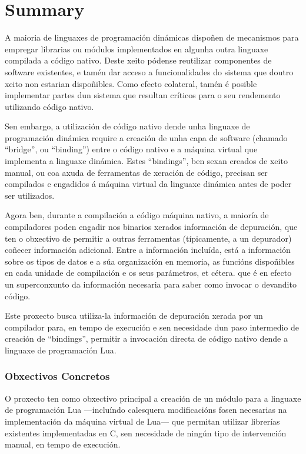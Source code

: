 \chapter*{Summary}

A maioria de linguaxes de programación dinámicas dispoñen de mecanismos
para empregar librarias ou módulos implementados en algunha outra linguaxe
compilada a código nativo. Deste xeito pódense reutilizar componentes
de software existentes, e tamén dar acceso a funcionalidades do sistema que
doutro xeito non estarian dispoñibles. Como efecto colateral, tamén é posible
implementar partes dun sistema que resultan críticos para o seu rendemento
utilizando código nativo.

Sen embargo, a utilización de código nativo dende unha linguaxe de
programación dinámica require a creación de unha capa de software (chamado
“bridge”, ou “binding”) entre o código nativo e a máquina virtual que
implementa a linguaxe dinámica. Estes “bindings”, ben sexan creados de
xeito manual, ou coa axuda de ferramentas de xeración de código, precisan
ser compilados e engadidos á máquina virtual da linguaxe dinámica antes
de poder ser utilizados.

Agora ben, durante a compilación a código máquina nativo, a maioría de
compiladores poden engadir nos binarios xerados información de depuración,
que ten o obxectivo de permitir a outras ferramentas (típicamente, a un
depurador) coñecer información adicional. Entre a información incluída,
está a información sobre os tipos de datos e a súa organización en memoria,
as funcións dispoñibles en cada unidade de compilación e os seus parámetros,
et cétera. que é en efecto un superconxunto da información necesaria para
saber como invocar o devandito código.

Este proxecto busca utiliza-la información de depuración xerada por un
compilador para, en tempo de execución e sen necesidade dun paso intermedio
de creación de “bindings”, permitir a invocación directa de código nativo
dende a linguaxe de programación Lua.

\subsection*{Obxectivos Concretos}

O proxecto ten como obxectivo principal a creación de un módulo para a
linguaxe de programación Lua —incluíndo calesquera modificacións fosen
necesarias na implementación da máquina virtual de Lua— que permitan utilizar
librerías existentes implementadas en C, sen necesidade de ningún tipo de
intervención manual, en tempo de execución.


